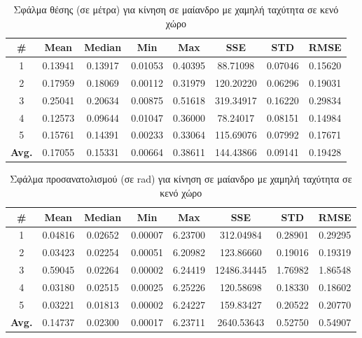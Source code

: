 \begin{table}[H]
    \centering
    \caption{Σφάλμα θέσης (σε μέτρα) για κίνηση σε μαίανδρο με χαμηλή ταχύτητα σε κενό χώρο}
    \label{tab:position_error_meander_slow_box}
    \begin{tabular}{| c | c | c | c | c | c | c | c | }
        \hline
        \rowcolor{Gray}
        \# & Mean & Median & Min & Max & SSE & STD & RMSE \\
        \hline
        1 & 0.13941 & 0.13917 & 0.01053 & 0.40395 & 88.71098 & 0.07046 & 0.15620 \\
        2 & 0.17959 & 0.18069 & 0.00112 & 0.31979 & 120.20220 & 0.06296 & 0.19031 \\
        3 & 0.25041 & 0.20634 & 0.00875 & 0.51618 & 319.34917 & 0.16220 & 0.29834 \\
        4 & 0.12573 & 0.09644 & 0.01047 & 0.36000 & 78.24017 & 0.08151 & 0.14984 \\
        5 & 0.15761 & 0.14391 & 0.00233 & 0.33064 & 115.69076 & 0.07992 & 0.17671 \\
        \hline
        \textbf{Avg.} & 0.17055 & 0.15331 & 0.00664 & 0.38611 & 144.43866 & 0.09141 & 0.19428 \\
        \hline
    \end{tabular}
\end{table}

\begin{table}[H]
    \centering
    \caption{Σφάλμα προσανατολισμού (σε rad) για κίνηση σε μαίανδρο με χαμηλή ταχύτητα σε κενό χώρο}
    \label{tab:orientation_error_meander_slow_box}
    \begin{tabular}{| c | c | c | c | c | c | c | c | }
        \hline
        \rowcolor{Gray}
        \# & Mean & Median & Min & Max & SSE & STD & RMSE \\
        \hline
        1 & 0.04816 & 0.02652 & 0.00007 & 6.23700 & 312.04984 & 0.28901 & 0.29295 \\
        2 & 0.03423 & 0.02254 & 0.00051 & 6.20982 & 123.86660 & 0.19016 & 0.19319 \\
        3 & 0.59045 & 0.02264 & 0.00002 & 6.24419 & 12486.34445 & 1.76982 & 1.86548 \\
        4 & 0.03180 & 0.02515 & 0.00025 & 6.25226 & 120.58698 & 0.18330 & 0.18602 \\
        5 & 0.03221 & 0.01813 & 0.00002 & 6.24227 & 159.83427 & 0.20522 & 0.20770 \\
        \hline
        \textbf{Avg.} & 0.14737 & 0.02300 & 0.00017 & 6.23711 & 2640.53643 & 0.52750 & 0.54907 \\
        \hline
    \end{tabular}
\end{table}

